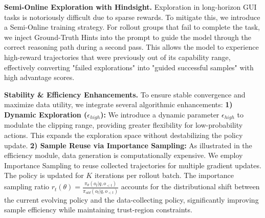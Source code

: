 \noindent\textbf{Semi-Online Exploration with Hindsight.}
Exploration in long-horizon GUI tasks is notoriously difficult due to sparse rewards. To mitigate this, we introduce a Semi-Online training strategy. For rollout groups that fail to complete the task, we inject Ground-Truth Hints into the prompt to guide the model through the correct reasoning path during a second pass. This allows the model to experience high-reward trajectories that were previously out of its capability range, effectively converting "failed explorations" into "guided successful samples" with high advantage scores.


\noindent\textbf{Stability \& Efficiency Enhancements.}
To ensure stable convergence and maximize data utility, we integrate several algorithmic enhancements:
\textbf{1) Dynamic Exploration ($\epsilon_{high}$):} We introduce a dynamic parameter $\epsilon_{high}$ to modulate the clipping range, providing greater flexibility for low-probability actions. This expands the exploration space without destabilizing the policy update.
\textbf{2) Sample Reuse via Importance Sampling:} As illustrated in the efficiency module, data generation is computationally expensive. We employ Importance Sampling to reuse collected trajectories for multiple gradient updates. The policy is updated for $K$ iterations per rollout batch. 
The importance sampling ratio $r_t(\theta) = \frac{\pi_\theta(o_t|q,o_{<t})}{\pi_{old}(o_t|q,o_{<t})}$ accounts for the distributional shift between the current evolving policy and the data-collecting policy, significantly improving sample efficiency while maintaining trust-region constraints.


